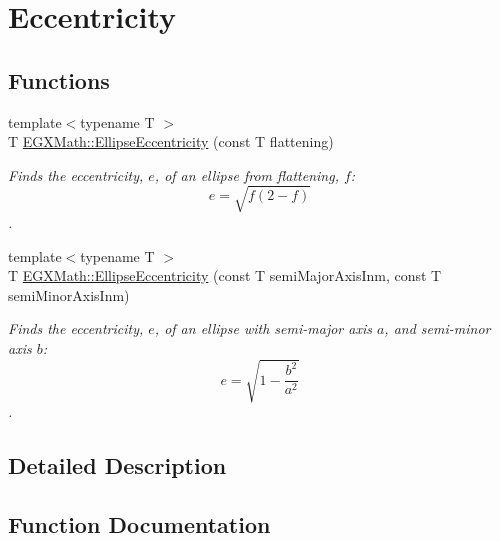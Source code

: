 \hypertarget{group___e_g_x_math-_geometry-2_d-_ellipse-_eccentricity}{}\section{Eccentricity}
\label{group___e_g_x_math-_geometry-2_d-_ellipse-_eccentricity}
\subsection*{Functions}
\begin{DoxyCompactItemize}
\item 
{\footnotesize template$<$typename T $>$ }\\T \mbox{\hyperlink{group___e_g_x_math-_geometry-2_d-_ellipse-_eccentricity_ga6a0a7fba17f782616894cfc447628c33}{E\+G\+X\+Math\+::\+Ellipse\+Eccentricity}} (const T flattening)
\begin{DoxyCompactList}\small\item\em Finds the eccentricity, $e$, of an ellipse from flattening, $f$\+: \[ e = \sqrt{f (2 - f)} \]. \end{DoxyCompactList}\item 
{\footnotesize template$<$typename T $>$ }\\T \mbox{\hyperlink{group___e_g_x_math-_geometry-2_d-_ellipse-_eccentricity_ga4e01cf027d303bb4ecb75606e5240d6c}{E\+G\+X\+Math\+::\+Ellipse\+Eccentricity}} (const T semi\+Major\+Axis\+Inm, const T semi\+Minor\+Axis\+Inm)
\begin{DoxyCompactList}\small\item\em Finds the eccentricity, $e$, of an ellipse with semi-\/major axis $a$, and semi-\/minor axis $b$\+: \[ e = \sqrt{1-\frac{b^2}{a^2}}\]. \end{DoxyCompactList}\end{DoxyCompactItemize}


\subsection{Detailed Description}


\subsection{Function Documentation}
\mbox{\label{group___e_g_x_math-_geometry-2_d-_ellipse-_eccentricity_ga6a0a7fba17f782616894cfc447628c33}} 
